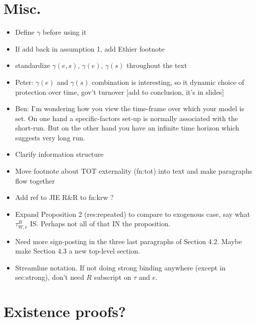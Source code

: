 \documentclass[12pt]{article}
\newcommand{\ga}{\gamma}
\begin{document}
\section{Misc.}
\begin{itemize}
	\item Define $\ga$ before using it
	\item If add back in assumption 1, add Ethier footnote
	\item standardize $\ga(e,s)$, $\ga(e)$, $\ga(s)$ throughout the text
	\item Peter: $\ga(e)$ and $\ga(s)$ combination is interesting, so it dynamic choice of protection over time, gov't turnover [add to conclusion, it's in slides]
	\item Ben: I'm wondering how you view the time-frame over which your model is set.  On one hand a specific-factors set-up is normally associated with the short-run.  But on the other hand you have an infinite time horizon which suggests very long run.
	\item Clarify information structure
	\item Move footnote about TOT externality (fn:tot) into text and make paragraphs flow together
	\item Add ref to JIE R$\&$R to fn:krw ?
	\item Expand Proposition 2 (res:repeated) to compare to exogenous case, say what $\tau^R_{W,e}$ IS. Perhaps not all of that IN the proposition.
	\item Need more sign-posting in the three last paragraphs of Section 4.2. Maybe make Section 4.3 a new top-level section.
	\item Streamline notation. If not doing strong binding anywhere (except in sec:strong), don't need $R$ subscript on $\tau$ and $e$.
\end{itemize}


\section{Existence proofs?}
\end{document}

